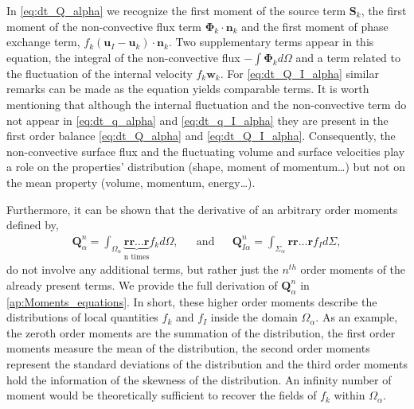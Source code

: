In \ref{eq:dt_Q_alpha} we recognize the first moment of the source term $\textbf{S}_k$, the first moment of the non-convective flux term $\mathbf{\Phi}_k\cdot\textbf{n}_k$ and the first moment of phase exchange term, $f_k (\textbf{u}_I-\textbf{u}_k)\cdot\textbf{n}_k$. 
Two supplementary terms appear in this equation, the integral of the non-convective flux $- \int \bm{\Phi}_k d\Omega$ and a term related to the fluctuation of the internal velocity $f_k \textbf{w}_k$.
For \ref{eq:dt_Q_I_alpha} similar remarks can be made as the equation yields comparable terms. 
It is worth mentioning that although the internal fluctuation and the non-convective term do not appear in \ref{eq:dt_q_alpha} and \ref{eq:dt_q_I_alpha} they are present in the first order balance \ref{eq:dt_Q_alpha} and \ref{eq:dt_Q_I_alpha}. 
Consequently, the non-convective surface flux and the fluctuating volume and surface velocities play a role on the properties' distribution (shape, moment of momentum\ldots) but not on the mean property (volume, momentum, energy\ldots). 

Furthermore, it can be shown that the derivative of an arbitrary order moments defined by,
\begin{align*}
    \textbf{Q}_\alpha^n
    = \int_{\Omega_\alpha} \underbrace{
        \textbf{r}\textbf{r}\ldots\textbf{r}
    }_{
        \text{n times}
    }
    f_k d\Omega,
    && \text{and} &&
    \textbf{Q}_{I\alpha}^n
    = \int_{\Sigma_\alpha}
        \textbf{r}\textbf{r}\ldots\textbf{r}
    f_I d\Sigma,
\end{align*} 
do not involve any additional terms, but rather just the $n^{th}$ order moments of the already present terms.
We provide the full derivation of $\textbf{Q}_\alpha^n$ in \ref{ap:Moments_equations}.
In short, these higher order moments describe the distributions of local quantities $f_k$ and $f_I$ inside the domain $\Omega_\alpha$.
As an example, the zeroth order moments are the summation of the distribution, the first order moments measure the mean of the distribution, the second order moments represent the standard deviations of the distribution and the third order moments hold the information of the skewness of the distribution. 
An infinity number of moment would be theoretically sufficient to recover the fields of $f_k$ within $\Omega_\alpha$. 

